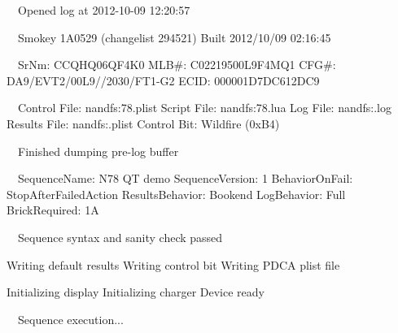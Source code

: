 \begin{AnnotedLogFile}
~~Opened log at 2012-10-09 12:20:57

~~Smokey 1A0529 (changelist 294521)
Built 2012/10/09 02:16:45

~~SrNm: CCQHQ06QF4K0
MLB#: C02219500L9F4MQ1
CFG#: DA9/EVT2/00L9//2030/FT1-G2
ECID: 000001D7DC612DC9

~~Control File: nandfs:\AppleInternal\Diags\Logs\Smokey\Wildfire\N78.plist
Script File:  nandfs:\AppleInternal\Diags\Logs\Smokey\Wildfire\N78.lua
Log File:     nandfs:\AppleInternal\Diags\Logs\Smokey\Wildfire\Smokey.log
Results File: nandfs:\AppleInternal\Diags\Logs\Smokey\Wildfire\PDCA.plist
Control Bit:  Wildfire (0xB4)

~~Finished dumping pre-log buffer

~~SequenceName:    N78 QT demo
SequenceVersion: 1
BehaviorOnFail:  StopAfterFailedAction
ResultsBehavior: Bookend
LogBehavior:     Full
BrickRequired:   1A

~~Sequence syntax and sanity check passed

Writing default results
Writing control bit
Writing PDCA plist file

Initializing display
Initializing charger
Device ready

~~Sequence execution...


\end{AnnotedLogFile}
